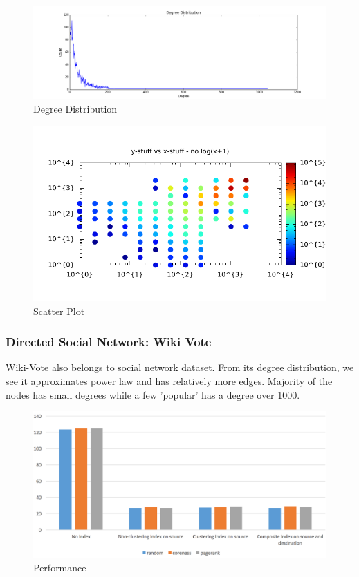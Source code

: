 \begin{figure}[H]
\centering
\includegraphics[width=1.0\linewidth]{fb_degree}
\caption{Degree Distribution}
\end{figure}

\begin{figure}[H]
\centering
\includegraphics[width=0.8\linewidth]{core_scatter}
\caption{Scatter Plot}
\end{figure}

\subsubsection{Directed Social Network: Wiki Vote}

Wiki-Vote also belongs to social network dataset. From its degree distribution, we see it approximates power law and has relatively more edges. Majority of the nodes has small degrees while a few 'popular' has a degree over 1000. 

\begin{figure}[H]
\centering
\includegraphics[width=0.8\linewidth]{wiki}
\caption{Performance}
\end{figure}

